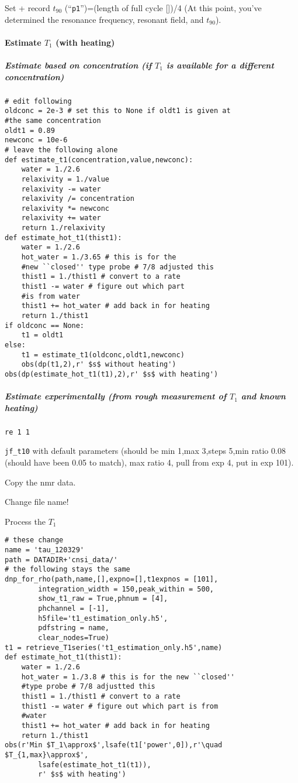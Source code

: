 Set + record $t_{90}$ (``\texttt{p1}'')=(length of full cycle [\us])/4 (At this point, you've determined the resonance frequency, resonant field, and $t_{90}$).

\paragraph{Estimate $T_1$ (with heating)}

\subparagraph{Estimate based on concentration {\tiny (if $T_1$ is available for a different concentration)}}

\begin{lstlisting}
# edit following
oldconc = 2e-3 # set this to None if oldt1 is given at
#the same concentration
oldt1 = 0.89
newconc = 10e-6
# leave the following alone
def estimate_t1(concentration,value,newconc):
    water = 1./2.6
    relaxivity = 1./value
    relaxivity -= water
    relaxivity /= concentration
    relaxivity *= newconc
    relaxivity += water
    return 1./relaxivity
def estimate_hot_t1(thist1):
    water = 1./2.6
    hot_water = 1./3.65 # this is for the
    #new ``closed'' type probe # 7/8 adjusted this
    thist1 = 1./thist1 # convert to a rate
    thist1 -= water # figure out which part
    #is from water
    thist1 += hot_water # add back in for heating
    return 1./thist1
if oldconc == None:
    t1 = oldt1
else:
    t1 = estimate_t1(oldconc,oldt1,newconc)
    obs(dp(t1,2),r' $s$ without heating')
obs(dp(estimate_hot_t1(t1),2),r' $s$ with heating')
\end{lstlisting}

\subparagraph{Estimate experimentally (from rough measurement of $T_1$ and known heating)}

\texttt{re 1 1}

\texttt{jf\_t10} with default parameters (should be min 1,max 3,steps 5,min ratio 0.08 (should have been 0.05 to match), max ratio 4, pull from exp 4, put in exp 101).

Copy the nmr data.

Change file name!

Process the $T_1$


\begin{scriptsize}
\begin{lstlisting}
# these change
name = 'tau_120329'
path = DATADIR+'cnsi_data/'
# the following stays the same
dnp_for_rho(path,name,[],expno=[],t1expnos = [101],
        integration_width = 150,peak_within = 500,
        show_t1_raw = True,phnum = [4],
        phchannel = [-1],
        h5file='t1_estimation_only.h5',
        pdfstring = name,
        clear_nodes=True)
t1 = retrieve_T1series('t1_estimation_only.h5',name)
def estimate_hot_t1(thist1):
    water = 1./2.6
    hot_water = 1./3.8 # this is for the new ``closed''
    #type probe # 7/8 adjustted this
    thist1 = 1./thist1 # convert to a rate
    thist1 -= water # figure out which part is from
    #water
    thist1 += hot_water # add back in for heating
    return 1./thist1
obs(r'Min $T_1\approx$',lsafe(t1['power',0]),r'\quad $T_{1,max}\approx$',
        lsafe(estimate_hot_t1(t1)),
        r' $s$ with heating')
\end{lstlisting}
\end{scriptsize}


